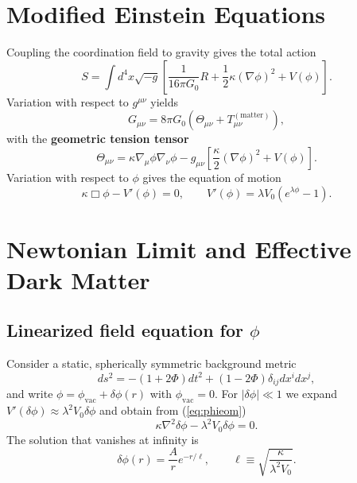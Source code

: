 \documentclass[12pt,a4paper]{article}
\begin{document}
	\section{Modified Einstein Equations}
	
	Coupling the coordination field to gravity gives the total action
	\begin{equation}
		S = \int d^4x \sqrt{-g} \left[ \frac{1}{16\pi G_0} R + \frac{1}{2}\kappa (\nabla\phi)^2 + V(\phi) \right].
		\label{eq:action}
	\end{equation}
	Variation with respect to \(g^{\mu\nu}\) yields
	\begin{equation}
		G_{\mu\nu} = 8\pi G_0 \left( \Theta_{\mu\nu} + T_{\mu\nu}^{(\mathrm{matter})} \right),
		\label{eq:einstein}
	\end{equation}
	with the \textbf{geometric tension tensor}
	\begin{equation}
		\Theta_{\mu\nu} = \kappa \nabla_\mu \phi \nabla_\nu \phi - g_{\mu\nu} \left[ \frac{\kappa}{2} (\nabla\phi)^2 + V(\phi) \right].
		\label{eq:Theta}
	\end{equation}
	Variation with respect to \(\phi\) gives the equation of motion
	\begin{equation}
		\kappa \Box \phi - V'(\phi) = 0, \qquad V'(\phi) = \lambda V_0 \left( e^{\lambda\phi} - 1 \right).
		\label{eq:phieom}
	\end{equation}
	
	\section{Newtonian Limit and Effective Dark Matter}
	
	\subsection{Linearized field equation for \(\phi\)}
	Consider a static, spherically symmetric background metric
	\[
	ds^2 = -(1+2\Phi)dt^2 + (1-2\Phi)\delta_{ij}dx^i dx^j,
	\]
	and write \(\phi = \phi_{\mathrm{vac}} + \delta\phi(r)\) with \(\phi_{\mathrm{vac}} = 0\). For \(|\delta\phi| \ll 1\) we expand \(V'(\delta\phi) \approx \lambda^2 V_0 \delta\phi\) and obtain from (\ref{eq:phieom})
	\begin{equation}
		\kappa \nabla^2 \delta\phi - \lambda^2 V_0 \delta\phi = 0.
		\label{eq:lin-phi}
	\end{equation}
	The solution that vanishes at infinity is
	\begin{equation}
		\delta\phi(r) = \frac{A}{r} e^{-r/\ell}, \qquad \ell \equiv \sqrt{\frac{\kappa}{\lambda^2 V_0}}.
		\label{eq:deltaphi-sol}
	\end{equation}
	
\end{document}
